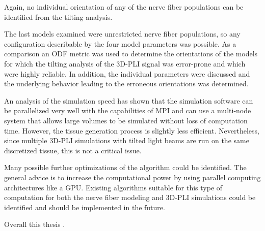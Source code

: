Again, no individual orientation of any of the nerve fiber populations can be identified from the tilting analysis.
\par
% 
The last models examined were unrestricted nerve fiber populations, so any configuration describable by the four model parameters was possible.
As a comparison an \ac{ODF} metric was used to determine the orientations of the models for which the tilting analysis of the \ac{3D-PLI} signal was error-prone and which were highly reliable.
In addition, the individual parameters were discussed and the underlying behavior leading to the erroneous orientations was determined.
\par
% 
An analysis of the simulation speed has shown that the simulation software can be parallelized very well with the capabilities of \ac{MPI} and can use a multi-node system that allows large volumes to be simulated without loss of computation time.
However, the tissue generation process is slightly less efficient.
Nevertheless, since multiple \ac{3D-PLI} simulations with tilted light beams are run on the same discretized tissue, this is not a critical issue.
\par
% 
Many possible further optimizations of the algorithm could be identified.
The general advice is to increase the computational power by using parallel computing architectures like a \ac{GPU}.
Existing algorithms suitable for this type of computation for both the nerve fiber modeling and \ac{3D-PLI} simulations could be identified and should be implemented in the future.
\par
% 
Overall this thesis \dummy{}.